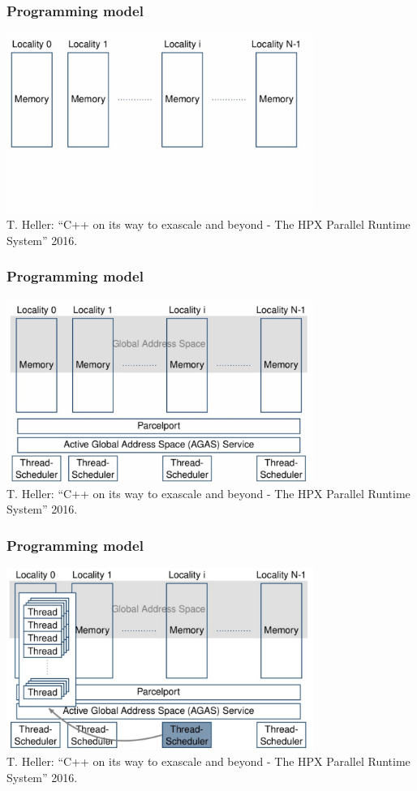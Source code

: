 \documentclass[compress]{beamer}
\begin{document}
\begin{frame}
	\frametitle{Programming model}
	\begin{center}
		\includegraphics[width=100mm]{Figures/hpxProgrammingModel1.png}\\
		\vspace{3mm}
		\tiny T. Heller: “C++ on its way to exascale and beyond - The HPX Parallel Runtime System” 2016.
		\normalsize
	\end{center}
\end{frame}
\begin{frame}
	\frametitle{Programming model}
	\begin{center}
		\includegraphics[width=100mm]{Figures/hpxProgrammingModel2.png}\\
		\vspace{3mm}
		\tiny T. Heller: “C++ on its way to exascale and beyond - The HPX Parallel Runtime System” 2016.
		\normalsize
	\end{center}
\end{frame}
\begin{frame}
	\frametitle{Programming model}
	\begin{center}
		\includegraphics[width=100mm]{Figures/hpxProgrammingModel3.png}\\
		\vspace{3mm}
		\tiny T. Heller: “C++ on its way to exascale and beyond - The HPX Parallel Runtime System” 2016.
		\normalsize
	\end{center}
\end{frame}
\end{document}
